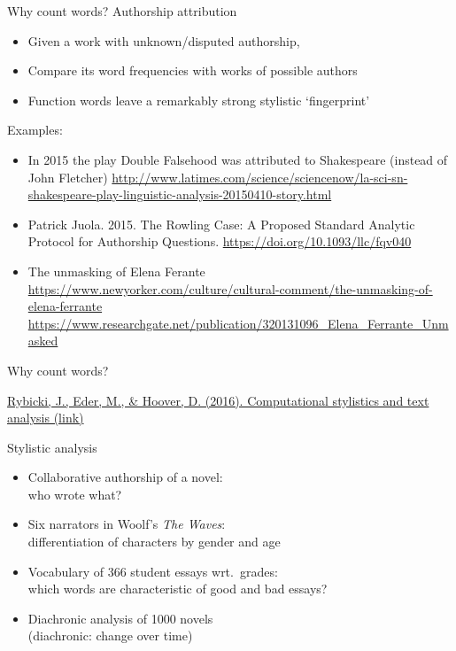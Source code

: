 \documentclass[aspectratio=169,usenames,dvipsnames]{beamer}
\begin{document}
\begin{frame}{Why count words?}
    Authorship attribution
    \begin{itemize}
        \item Given a work with unknown/disputed authorship,
        \item Compare its word frequencies with works of possible authors
        \item Function words leave a remarkably strong stylistic `fingerprint'
    \end{itemize}

    \pause
    Examples:
    \begin{itemize}
        \item In 2015 the play Double Falsehood was attributed to Shakespeare
                (instead of John Fletcher)
            \url{http://www.latimes.com/science/sciencenow/la-sci-sn-shakespeare-play-linguistic-analysis-20150410-story.html}

        \item Patrick Juola. 2015. The Rowling Case: A Proposed Standard Analytic Protocol for Authorship Questions. %
            \url{https://doi.org/10.1093/llc/fqv040}
        \item The unmasking of Elena Ferante
            \url{https://www.newyorker.com/culture/cultural-comment/the-unmasking-of-elena-ferrante}
            \\
            {\small\url{https://www.researchgate.net/publication/320131096_Elena_Ferrante_Unmasked}}
    \end{itemize}
\end{frame}

\begin{frame}{Why count words?}
    \begin{reference}
        \href{http://www.infotext.unisi.it/upload/rybickihoovereder_with_figures.pdf}{Rybicki, J., Eder, M., \& Hoover, D. (2016). Computational stylistics and text analysis (link)}
    \end{reference}
    Stylistic analysis
    \begin{itemize}
    \item Collaborative authorship of a novel:\\
        who wrote what?
    \item Six narrators in Woolf's \emph{The Waves}:\\
        differentiation of characters by gender and age
    \item Vocabulary of 366 student essays wrt.\ grades:\\
        which words are characteristic of good and bad essays?
    \item Diachronic analysis of 1000 novels\\
        (diachronic: change over time)
    \end{itemize}
\end{frame}
\end{document}
